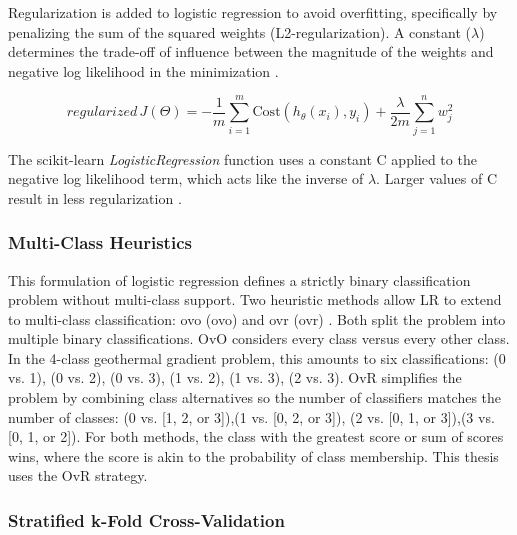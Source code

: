 Regularization is added to logistic regression to avoid overfitting, specifically by penalizing the sum of the squared weights (L2-regularization). A constant ($\lambda$) determines the trade-off of influence between the magnitude of the weights and negative log likelihood in the minimization \citep{ng_regularization_2011}.

\begin{equation}
\label{eq:logreg_cost_reg}
    regularized\,J(\Theta) = -\frac{1}{m}\sum_{i=1}^{m}{\text{Cost}(h_{\theta}(x_i),y_i) + \frac{\lambda}{2m}\sum_{j=1}^{n}{w_j^2}}
\end{equation}

The scikit-learn \textit{LogisticRegression} function uses a constant C applied to the negative log likelihood term, which acts like the inverse of $\lambda$. Larger values of C result in less regularization \citep{scikit-learn_1111_2021}.

\subsubsection{Multi-Class Heuristics} \label{ch5:multi_log_reg}

This formulation of logistic regression defines a strictly binary classification problem without multi-class support. Two heuristic methods allow LR to extend to multi-class classification: \acrlong{ovo} (\acrshort{ovo}) and \acrlong{ovr} (\acrshort{ovr}) \citep{brownlee_one-vs-rest_2020,scikit-learn_multiclass_2021}. Both split the problem into multiple binary classifications. OvO considers every class versus every other class. In the 4-class geothermal gradient problem, this amounts to six classifications: {(0 vs. 1), (0 vs. 2), (0 vs. 3), (1 vs. 2), (1 vs. 3), (2 vs. 3)}. OvR simplifies the problem by combining class alternatives so the number of classifiers matches the number of classes: {(0 vs. [1, 2, or 3]),(1 vs. [0, 2, or 3]), (2 vs. [0, 1, or 3]),(3 vs. [0, 1, or 2])}. For both methods, the class with the greatest score or sum of scores wins, where the score is akin to the probability of class membership. This thesis uses the OvR strategy.

\subsubsection{Stratified k-Fold Cross-Validation} \label{ch5:strat_kfold_cv}

